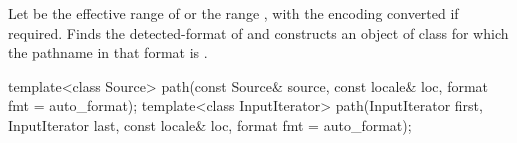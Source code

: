 \begin{itemdescr}
\pnum
\effects
Let  be the effective range of 
or the range , with the encoding converted if required.
Finds the detected-format of 
and constructs an object of class 
for which the pathname in that format is .
\end{itemdescr}

%
\begin{itemdecl}
template<class Source>
  path(const Source& source, const locale& loc, format fmt = auto_format);
template<class InputIterator>
  path(InputIterator first, InputIterator last, const locale& loc, format fmt = auto_format);
\end{itemdecl}


